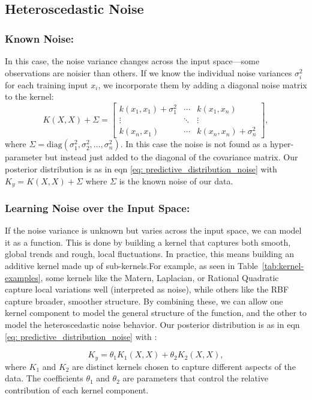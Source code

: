\documentclass{ucdgradtaughtthesis}
\begin{document}
\subsection{Heteroscedastic Noise}  
\subsubsection{Known Noise:}
%
In this case, the noise variance changes across the input space—some observations are noisier than others. If we know the individual noise variances \( \sigma_i^2 \) for each training input \( x_i \), we incorporate them by adding a diagonal noise matrix to the kernel:
\[
K(X, X) + \Sigma = 
\begin{bmatrix}
k(x_1, x_1) + \sigma_1^2 & \cdots & k(x_1, x_n) \\
\vdots & \ddots & \vdots \\
k(x_n, x_1) & \cdots & k(x_n, x_n) + \sigma_n^2
\end{bmatrix},
\]
where \( \Sigma = \text{diag}(\sigma_1^2, \sigma_2^2, \dots, \sigma_n^2) \).
In this case the noise is not found as a hyper-parameter but instead just added to the diagonal of the covariance matrix.
Our posterior distribution is as in eqn \ref{eq:  predictive_distribution_noise} with \(K_y =K(X, X) + \Sigma \) where \(\Sigma\) is the known noise of our data. 
%
\subsubsection{Learning Noise over the Input Space:}
%
If the noise variance is unknown but varies across the input space, we can model it as a function. 
This is done by building a kernel that captures both smooth, global trends and rough, local fluctuations. 
In practice, this means building an additive kernel made up of sub-kernels.For example, as seen in Table~\ref{tab:kernel-examples}, some kernels like the Matern, Laplacian, or Rational Quadratic capture local variations well (interpreted as noise),
while others like the RBF capture broader, smoother structure. By combining these, we can allow one kernel component to model the general structure of the function, and the other to model the heteroscedastic noise behavior. 
Our posterior distribution is as in eqn \ref{eq:  predictive_distribution_noise} with :

\begin{equation}
    K_y = \theta_1 K_1(X, X) + \theta_2 K_2(X, X),
    \label{eq:additive_kernel}
\end{equation}
where \( K_1 \) and \( K_2 \) are distinct kernels chosen to capture different aspects of the data. 
The coefficients \( \theta_1 \) and \( \theta_2 \) are parameters that control the relative contribution of each kernel component.
\end{document}
